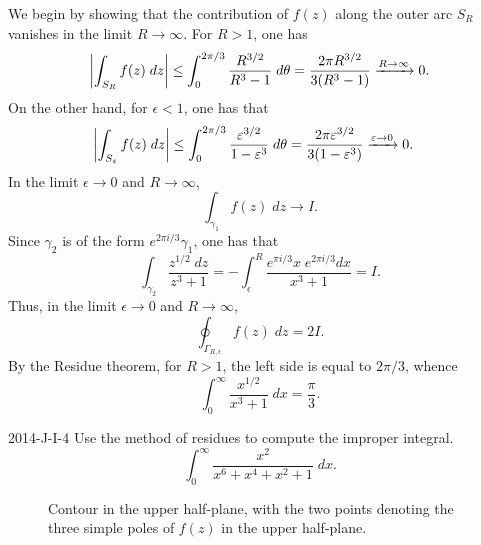 \documentclass{article}
\begin{document}
	We begin by showing that the contribution of $f(z)$ along the outer arc $S_{R}$ vanishes in the limit $R \to \infty$. For $R > 1$, one has 
	\begin{align*}
		\begin{split}
			\left| \int_{S_{R}}f(z)\;dz \right| \leq \int_{0}^{2\pi/3}\frac{R^{3/2}}{R^{3} - 1}\;d\theta = \frac{2\pi R^{3/2}}{3(R^{3} - 1)} \xrightarrow{R \to \infty} 0. 
		\end{split}
	\end{align*}
	On the other hand, for $\epsilon < 1$, one has that 
	\begin{align*}
		\begin{split}
			\left| \int_{S_{\varepsilon}}f(z)\;dz \right| &\leq \int_{0}^{2\pi/3}\frac{\varepsilon^{3/2}}{1 - \varepsilon^{3}}\;d\theta = \frac{2\pi \varepsilon^{3/2}}{3(1 - \varepsilon^{3})}\xrightarrow{\varepsilon \to 0} 0. 
		\end{split}
	\end{align*}
	In the limit $\epsilon \to 0$ and $R \to \infty$, 
	\begin{equation*}
		\int_{\gamma_{1}}f(z)\;dz \to I. 
	\end{equation*}
	Since $\gamma_{2}$ is of the form $e^{2\pi i/3}\gamma_{1}$, one has that 
	\begin{equation*}
		\int_{\gamma_{2}}\frac{z^{1/2}\;dz}{z^{3} + 1} = -\int_{\epsilon}^{R}\frac{e^{\pi i /3}x\;e^{2\pi i /3}dx}{x^{3} + 1} = I. 
	\end{equation*}
	Thus, in the limit $\epsilon \to 0$ and $R \to \infty$, 
	\begin{equation*}
		\oint_{\Gamma_{R, \epsilon}}f(z)\;dz = 2I. 
	\end{equation*}
	By the Residue theorem, for $R > 1$, the left side is equal to $2\pi/3$, whence 
	\begin{equation*}
		\int_{0}^{\infty}\frac{x^{1/2}}{x^{3} + 1}\;dx = \frac{\pi}{3}. 
	\end{equation*}
	\begin{prb}{2014-J-I-4}
		Use the method of residues to compute the improper integral. 
		\begin{equation*}
			\int_{0}^{\infty}\frac{x^{2}}{x^{6} + x^{4} + x^{2} + 1}\;dx. 
		\end{equation*}
	\end{prb}
	\begin{figure}[h!]
		\centering
		\caption{Contour in the upper half-plane, with the two points denoting the three simple poles of $f(z)$ in the upper half-plane.}
		\label{fig:2018JI2}
	\end{figure}
\end{document}

